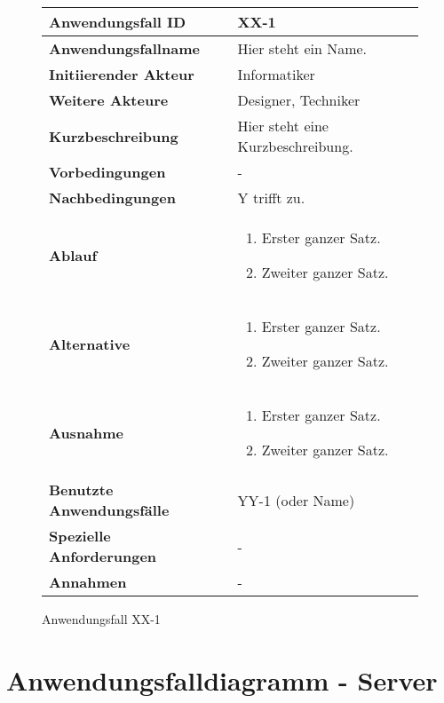 \newpage

\begin{figure}[h]
	\centering
	\begin{tabularx}{\textwidth}{ X | X }
		\textbf{Anwendungsfall ID} & XX-1 \\ \hline
		\textbf{Anwendungsfallname} & Hier steht ein Name. \\ \hline
		\textbf{Initiierender Akteur} & Informatiker \\ \hline
		\textbf{Weitere Akteure} & Designer, Techniker  \\ \hline
		\textbf{Kurzbeschreibung} & Hier steht eine Kurzbeschreibung.  \\ \hline
		\textbf{Vorbedingungen} & -  \\ \hline
		\textbf{Nachbedingungen} & Y trifft zu.  \\ \hline
		\textbf{Ablauf} &
			\begin{enumerate}
				\item Erster ganzer Satz.
				\item Zweiter ganzer Satz.
			\end{enumerate} \\ \hline
		\textbf{Alternative} &
				\begin{enumerate}
					\item Erster ganzer Satz.
					\item Zweiter ganzer Satz.
				\end{enumerate}  \\ \hline
		\textbf{Ausnahme} &
				\begin{enumerate}
					\item Erster ganzer Satz.
					\item Zweiter ganzer Satz.
				\end{enumerate}  \\ \hline
		\textbf{Benutzte Anwendungsfälle} & YY-1 (oder Name) \\ \hline
		\textbf{Spezielle Anforderungen} & - \\ \hline
		\textbf{Annahmen} & -
	\end{tabularx}
	\caption{Anwendungsfall XX-1}
	\label{fig:anwendungsfall-app-tabelle-xx-1}
\end{figure}

\newpage



\section{Anwendungsfalldiagramm - Server}

